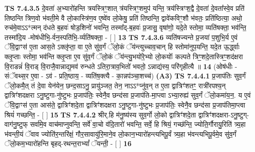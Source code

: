 \documentclass[17pt]{extarticle}
\begin{document}
                  \newline
                                \textbf{ TS 7.4.3.5} \newline
                  दे॒वता॑ अ॒भ्यारो॑हन्ति त्रयस्त्रिꣳ॒॒शात् त्र॑यस्त्रिꣳ॒॒शमुप॑ यन्ति॒ त्रय॑स्त्रिꣳश॒द्वै दे॒वता॑ दे॒वता᳚स्वे॒व प्रति॑ तिष्ठन्ति त्रिण॒वो भ॑वती॒मे वै लो॒कास्त्रि॑ण॒व ए॒ष्वे॑व लो॒केषु॒ प्रति॑ तिष्ठन्ति॒ द्वावे॑कविꣳ॒॒शौ भ॑वतः॒ प्रति॑ष्ठित्या॒ अथो॒ रुच॑मे॒वाऽऽ*त्मन् द॑धते ब॒हवः॑ षोड॒शिनो॑ भवन्ति॒ तस्मा᳚द्-ब॒हवः॑ प्र॒जासु॒ वृषा॑णो॒ यदे॒ते स्तोमा॒ व्यति॑षक्ता॒ भव॑न्ति॒ तस्मा॑दि॒य -मोष॑धीभि॒-र्वन॒स्पति॑भि॒-र्व्यति॑षक्ता॒ - [  ] \textbf{  13} \newline
                  \newline
                                \textbf{ TS 7.4.3.6} \newline
                  व्यति॑षज्यन्ते प्र॒जया॑ प॒शुभि॒र्य ए॒वं ॅवि॒द्वाꣳस॑ ए॒ता आस॒ते ऽक्लृ॑प्ता॒ वा ए॒ते सु॑व॒र्गं ॅलो॒कं ॅय॑न्त्युच्चाव॒चान् हि स्तोमा॑नुप॒यन्ति॒ यदे॒त ऊ॒र्द्ध्वाः क्लृ॒प्ताः स्तोमा॒ भव॑न्ति क्लृ॒प्ता ए॒व सु॑व॒र्गं ॅलो॒कं ॅय॑न्त्यु॒भयो॑रे॒भ्यो लो॒कयोः᳚ कल्पते त्रिꣳ॒॒शदे॒तास्त्रिꣳ॒॒शद॑क्षरा वि॒राडन्नं॑ वि॒राड् वि॒राजै॒वान्नाद्य॒मव॑ रुन्धते ऽतिरा॒त्राव॒भितो॑ भवतो॒ ऽन्नाद्य॑स्य॒ परि॑गृहीत्यै ॥ \textbf{  14 } \newline
                  \newline
                      (ओष॑धीः - संॅवथ्स॒र ए॒वा - ऽव॑ - प्रति॒ष्ठाय॒ - व्यति॑ष॒क्त्यै - का॒न्नप॑ञ्चा॒शच्च॑)  \textbf{(A3)} \newline \newline
                                        \textbf{ TS 7.4.4.1} \newline
                  प्र॒जाप॑तिः सुव॒र्गं ॅलो॒कमै॒त् तं दे॒वा येन॑येन॒ छन्द॒साऽनु॒ प्रायु॑ञ्जत॒ तेन॒ नाऽऽ*प्नु॑व॒न् त ए॒ता द्वात्रिꣳ॑शतꣳ॒॒ रात्री॑रपश्य॒न् द्वात्रिꣳ॑शदक्षरा ऽनु॒ष्टुगा-नु॑ष्टुभः प्र॒जाप॑तिः॒ स्वेनै॒व छन्द॑सा प्र॒जाप॑ति-मा॒प्त्वा ऽभ्या॒रुह्य॑ सुव॒र्गं ॅलो॒कमा॑य॒न॒. य ए॒वं ॅवि॒द्वाꣳस॑ ए॒ता आस॑ते॒ द्वात्रिꣳ॑शदे॒ता द्वात्रिꣳ॑शदक्षरा ऽनु॒ष्टुगा-नु॑ष्टुभः प्र॒जाप॑तिः॒ स्वेनै॒व छन्द॑सा प्र॒जाप॑तिमा॒प्त्वा श्रियं॑ गच्छन्ति॒ - [  ] \textbf{  15} \newline
                  \newline
                                \textbf{ TS 7.4.4.2} \newline
                  श्रीर्.हि म॑नु॒ष्य॑स्य सुव॒र्गो लो॒को द्वात्रिꣳ॑शदे॒ता द्वात्रिꣳ॑शदक्षरा-ऽनु॒ष्टुग्-वाग॑नु॒ष्टुफ् सर्वा॑मे॒व वाच॑माप्नुवन्ति॒ सर्वे॑ वा॒चो व॑दि॒तारो॑ भवन्ति॒ सर्वे॒ हि श्रियं॒ गच्छ॑न्ति॒ ज्योति॒र्गौरायु॒रिति॑ त्र्य॒हा भ॑वन्ती॒यं ॅवाव ज्योति॑र॒न्तरि॑क्षं॒ गौर॒सावायु॑रि॒माने॒व लो॒कान॒भ्यारो॑हन्त्यभिपू॒र्वं त्र्य॒हा भ॑वन्त्यभिपू॒र्वमे॒व सु॑व॒र्गं ॅलो॒कम॒भ्यारो॑हन्ति बृहद्-रथन्त॒राभ्यां᳚ ॅयन्ती॒ - [  ] \textbf{  16} \newline
\end{document}

